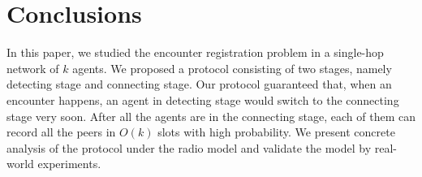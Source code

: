 \section{Conclusions}
\label{sectionconclusion}
\vspace{-0.01in}
In this paper, we studied the encounter registration problem in a single-hop network of $k$ 
agents. We proposed a protocol consisting of two stages, namely detecting stage and 
connecting stage. Our protocol guaranteed that, when an encounter happens, 
an agent in detecting stage would switch 
to the connecting stage very soon. After all the agents are in the connecting stage,  
each of them can record all the peers in $O(k)$ slots with high probability.
We present concrete analysis of the protocol under the radio model and validate the model 
by real-world experiments. 